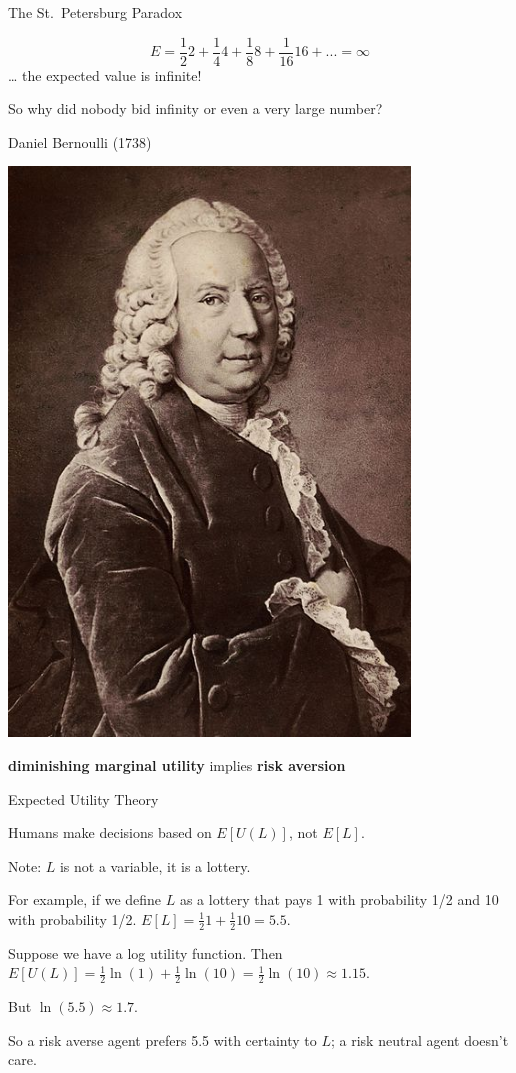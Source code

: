 \documentclass[ignorenonframetext,]{beamer}
\begin{document}
\begin{frame}{The St.~Petersburg Paradox}
\protect\hypertarget{the-st.petersburg-paradox-1}{}

\[
E = \frac{1}{2}2+\frac{1}{4}4+\frac{1}{8}8 + \frac{1}{16}16+...=\infty
\] \ldots{} the expected value is infinite!

So why did nobody bid infinity or even a very large number?

\end{frame}

\begin{frame}{Daniel Bernoulli (1738)}
\protect\hypertarget{daniel-bernoulli-1738}{}

\includegraphics[width=0.8\textwidth,height=\textheight]{bernoulli.jpg}

\textbf{diminishing marginal utility} implies \textbf{risk aversion}

\end{frame}

\begin{frame}{Expected Utility Theory}
\protect\hypertarget{expected-utility-theory}{}

Humans make decisions based on \(E[U(L)]\), not \(E[L]\).

Note: \(L\) is not a variable, it is a lottery.

For example, if we define \(L\) as a lottery that pays 1 with
probability 1/2 and 10 with probability 1/2.
\(E[L] = \frac{1}{2}1 + \frac{1}{2}10 = 5.5\).

Suppose we have a log utility function. Then
\(E[U(L)] = \frac{1}{2}\ln(1) + \frac{1}{2}\ln(10) = \frac{1}{2}\ln(10) \approx 1.15\).

But \(\ln(5.5) \approx 1.7\).

So a risk averse agent prefers 5.5 with certainty to \(L\); a risk
neutral agent doesn't care.

\end{frame}
\end{document}
